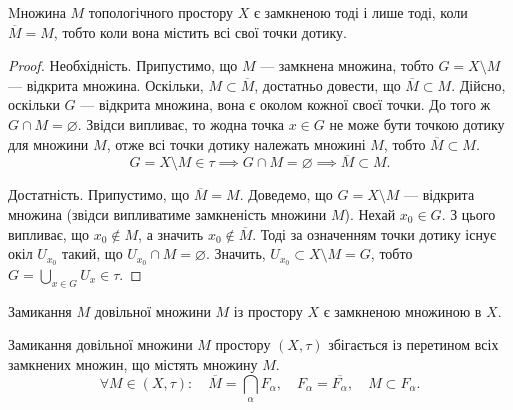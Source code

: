 \documentclass[a4paper, 12pt]{article}
\renewcommand{\emptyset}{\varnothing}
\begin{document}
\begin{theorem}
	Mножина $M$
	топологічного простору $X$ є замкненою тоді і лише тоді,
	коли $\overline{M} = M$, тобто коли вона містить всі свої точки
	дотику.
\end{theorem}

\begin{proof}
	Необхідність. Припустимо, що $M$ --- замкнена
	множина, тобто $G = X \setminus M$ --- відкрита множина. Оскільки,
	$M \subset \overline{M}$, достатньо довести, що $\overline{M} \subset M$. Дійсно, оскільки $G$ --- відкрита множина, вона є околом кожної своєї точки.
	До того ж $G \cap M = \emptyset$. Звідси випливає, то жодна точка
	$x \in G$ не може бути точкою дотику для множини $M$, отже
	всі точки дотику належать множині $M$, тобто $\overline{M} \subset M$. \[ G = X \setminus M \in \tau \implies G \cap M = \emptyset \implies \overline{M} \subset M. \]

	Достатність. Припустимо, що $\overline{M} = M$. Доведемо, що
	$G = X \setminus M$ --- відкрита множина (звідси випливатиме
	замкненість множини $M$). Нехай $x_0 \in G$. З цього випливає,
	що $x_0 \notin M$, а значить $x_0 \notin \overline{M}$. Тоді за означенням точки
	дотику існує окіл $U_{x_0}$ такий, що $U_{x_0} \cap M = \emptyset$. Значить,
	$U_{x_0} \subset X \setminus M = G$, тобто $G = \bigcup_{x \in G} U_x \in \tau$.
\end{proof}

\begin{corollary}
	Замикання $M$ довільної множини $M$ із
	простору $X$ є замкненою множиною в $X$.
\end{corollary}

\begin{theorem}
	Замикання довільної множини $M$ простору
	$(X, \tau)$ збігається із перетином всіх замкнених множин, що
	містять множину $M$. \[ \forall M \in (X, \tau): \quad \overline{M} = \bigcap_\alpha F_\alpha, \quad F_\alpha = \overline{F_\alpha}, \quad M \subset F_\alpha. \]
\end{theorem}
\end{document}
